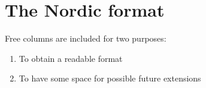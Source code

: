 \chapter{The Nordic format}
\label{app:nordic}

Free columns are included for two purposes: 
\begin{enumerate}
\item To obtain a readable format 
\item To have some space for possible future extensions
\end{enumerate}


